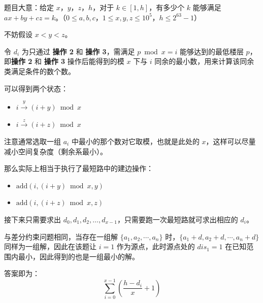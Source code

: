 \begin{tcolorbox}
题目大意：给定 $x$，$y$，$z$，$h$，对于 $k \in [1,h]$，有多少个 $k$ 能够满足 $ax+by+cz=k$。（$0\leq a,b,c$，$1\le x,y,z\le 10^5$，$h\le 2^{63}-1$）
\end{tcolorbox}

\par \noindent 不妨假设 $x < y < z$。

\par \noindent 令 $d_i$ 为只通过 \textbf{操作 2} 和 \textbf{操作 3}，需满足 $p\bmod x = i$ 能够达到的最低楼层 $p$，即\textbf{操作 2} 和 \textbf{操作 3} 操作后能得到的模 $x$ 下与 $i$ 同余的最小数，用来计算该同余类满足条件的数个数。
~\\
\par \noindent 可以得到两个状态：
\begin{itemize}
\item $i \xrightarrow{y} (i+y) \bmod x$
\item $i \xrightarrow{z} (i+z) \bmod x$
\end{itemize}

\par \noindent 注意通常选取一组 $a_i$ 中最小的那个数对它取模，也就是此处的 $x$，这样可以尽量减小空间复杂度（剩余系最小）。
~\\
\par \noindent 那么实际上相当于执行了最短路中的建边操作：
\begin{itemize}
\item $\text{add}(i, (i+y) \bmod x, y)$
\item $\text{add}(i, (i+z) \bmod x, z)$
\end{itemize}

\par \noindent 接下来只需要求出 $d_0, d_1, d_2, \dots, d_{x-1}$，只需要跑一次最短路就可求出相应的 $d_i$。
~\\
\par \noindent 与差分约束问题相同，当存在一组解 $\{a_1,a_2,\cdots,a_n\}$ 时，$\{a_1+d,a_2+d,\cdots,a_n+d\}$ 同样为一组解，因此在该题让 $i=1$ 作为源点，此时源点处的 $dis_{1}=1$ 在已知范围内最小，因此得到的也是一组最小的解。

\par \noindent 答案即为：
$$
\sum_{i=0}^{x-1}\left(\frac{h-d_i}{x} + 1\right)
$$